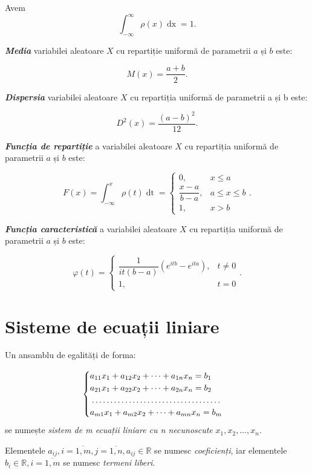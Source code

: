\documentclass[9pt,a4paper]{article}
\begin{document}
Avem $$\int_{-\infty}^{\infty} \rho (x) \mathop{dx} = 1.$$

\textbf{\textit{Media}} variabilei aleatoare $X$ cu repartiție uniformă de parametrii $a$ și $b$ este:

$$M(x) = \frac{a+b}{2}.$$

\textbf{\textit{Dispersia}} variabilei aleatoare $X$ cu repartiția uniformă de parametrii a și b este:

$$D^2(x) = \frac{(a-b)^2}{12}.$$

\textbf{\textit{Funcția de repartiție}} a variabilei aleatoare $X$ cu repartiția uniformă de parametrii $a$ și $b$ este:

$$F(x) = \int_{-\infty}^x \rho(t) \mathop{dt} = 
\begin{cases}
    0, &x \leq a \\ \dfrac{x-a}{b-a}, &a \leq x \leq b \\ 1, &x > b
\end{cases}.$$

\textbf{\textit{Funcția caracteristică}} a variabilei aleatoare $X$ cu repartiția uniformă de parametrii $a$ și $b$ este:

$$\varphi(t) = 
\begin{cases}
    \dfrac{1}{it(b-a)}(e^{itb} - e^{ita}), &t \neq 0 \\ 1, &t = 0
\end{cases}.$$

\newpage

\section*{Sisteme de ecuații liniare}

Un ansamblu de egalități de forma:

\begin{equation} \label{eq:sistem}
    \begin{cases}
        a_{11}x_{1} + a_{12}x_2 + \dots + a_{1n}x_{n} = b_1 \\
        a_{21}x_{1} + a_{22}x_2 + \dots + a_{2n}x_{n} = b_2 \\
        \dotfill \\
        a_{m1}x_{1} + a_{m2}x_2 + \dots + a_{mn}x_{n} = b_m
    \end{cases}
\end{equation}
se numește \textit{sistem de m ecuații liniare cu n necunoscute} $x_1, x_2, \dots, x_n$.

Elementele $a_{ij}, i = \overline{1, m}, j = \overline{1, n}, a_{ij} \in \mathbb{R}$ se numesc \textit{coeficienți}, iar elementele $b_i \in \mathbb{R}, i = \overline{1,m}$ se numesc \textit{termeni liberi}.
\end{document}
